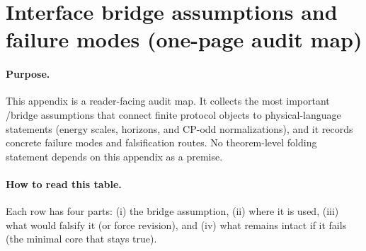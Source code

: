 \section{Interface bridge assumptions and failure modes (one-page audit map)}
\label{app:interface_bridge_assumptions_failure_modes}

\paragraph{Purpose.}
\AuditTag This appendix is a reader-facing audit map.
It collects the most important \InterfaceTag/\MatchTag bridge assumptions that connect finite protocol objects to physical-language statements (energy scales, horizons, and CP-odd normalizations), and it records concrete failure modes and falsification routes.
No theorem-level folding statement depends on this appendix as a premise.

\paragraph{How to read this table.}
Each row has four parts: (i) the bridge assumption, (ii) where it is used, (iii) what would falsify it (or force revision), and (iv) what remains intact if it fails (the minimal core that stays true).

